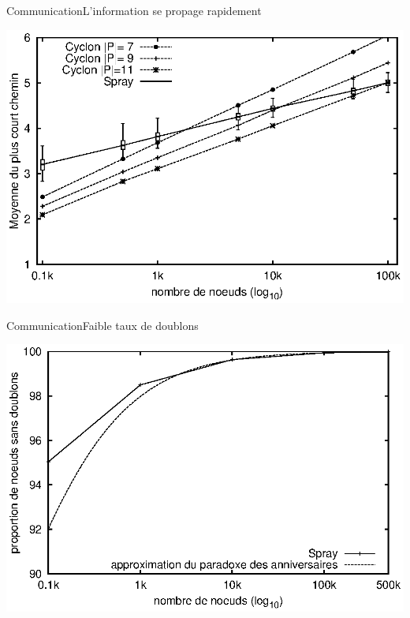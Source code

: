 \begin{frame}{Communication}{L'information se propage rapidement}
  \begin{center}
    \includegraphics[width=1\textwidth]{img/network/avgpath.eps}
  \end{center}
\end{frame}





\begin{frame}{Communication}{Faible taux de doublons}
  \begin{center}
    \includegraphics[width=1\textwidth]{img/network/duplicates.eps}
  \end{center}
\end{frame}


